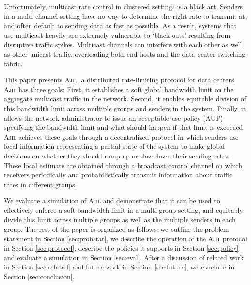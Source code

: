 \documentclass[times, 10pt,twocolumn]{article}
\newcommand{\sysname}{\textsc{Ajil}}
\begin{document}
Unfortunately, multicast rate control in clustered settings is a black art. Senders in a multi-channel setting have no way to determine the right rate to transmit at, and often default to sending data as fast as possible. As a result, systems that use multicast heavily are extremely vulnerable to `black-outs' resulting from disruptive traffic spikes. Multicast channels can interfere with each other as well as other unicast traffic, overloading both end-hosts and the data center switching fabric.

This paper presents \sysname{}, a distributed rate-limiting protocol for data centers. \sysname{} has three goals: First, it establishes a soft global bandwidth limit on the aggregate multicast traffic in the network. Second, it enables equitable division of this bandwidth limit across multiple groups and senders in the system. Finally, it allows the network administrator to issue an acceptable-use-policy (AUP) specifying the bandwidth limit and what should happen if that limit is exceeded. \sysname{} achieves these goals through a decentralized protocol in which senders use local information representing a partial state of the system to make global decisions on whether they should ramp up or slow down their sending rates. These local estimate are obtained through a broadcast control channel on which receivers periodically and probabilistically transmit information about traffic rates in different groups.

We evaluate a simulation of \sysname{} and demonstrate that it can be used to effectively enforce a soft bandwidth limit in a multi-group setting, and equitably divide this limit across multiple groups as well as the multiple senders in each group. The rest of the paper is organized as follows: we outline the problem statement in Section \ref{sec:probstat}, we describe the operation of the \sysname{} protocol in Section \ref{sec:protocol}, describe the policies it supports in Section \ref{sec:policy} and evaluate a simulation in Section \ref{sec:eval}. After a discussion of related work in Section \ref{sec:related} and future work in Section \ref{sec:future}, we conclude in Section \ref{sec:conclusion}.

 \label{sec:probstat}




 \label{sec:protocol}
\end{document}
